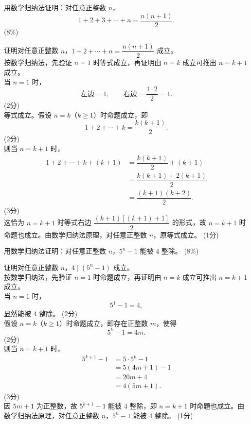 \documentclass[12pt,a4paper]{exam-zh}
\begin{document}
\begin{question}[points = 8]
    用数学归纳法证明：对任意正整数 $n$，
    \[
    1+2+3+\cdots+n=\dfrac{n(n+1)}{2}.
    \]
    \hfill (8\%)
\end{question}

\begin{solution}
    证明对任意正整数 $n$，$1+2+\cdots+n=\dfrac{n(n+1)}{2}$ 成立。\\
    按数学归纳法，先验证 $n=1$ 时等式成立，再证明由 $n=k$ 成立可推出 $n=k+1$ 成立。\\
    当 $n=1$ 时，
    \[
    \text{左边}=1,\qquad \text{右边}=\dfrac{1\cdot 2}{2}=1.
    \]
    \hfill (2分) \\
    等式成立。假设 $n=k$（$k\geqslant 1$）时命题成立，即
    \[
    1+2+\cdots+k=\dfrac{k(k+1)}{2}.
    \]
    \hfill (2分) \\
    则当 $n=k+1$ 时，
    \begin{align*}
        1+2+\cdots+k+(k+1) &= \dfrac{k(k+1)}{2}+(k+1) \\
        &= \dfrac{k(k+1)+2(k+1)}{2} \\
        &= \dfrac{(k+1)(k+2)}{2}.
    \end{align*}
    \hfill (3分) \\
    这恰为 $n=k+1$ 时等式右边 $\dfrac{(k+1)\left[(k+1)+1\right]}{2}$ 的形式，故 $n=k+1$ 时命题也成立。由数学归纳法原理，对任意正整数 $n$，原等式成立。
    \hfill (1分)
\end{solution}

\begin{question}[points = 8]
    用数学归纳法证明：对任意正整数 $n$，$5^n-1$ 能被 $4$ 整除。
    \hfill (8\%)
\end{question}

\begin{solution}
    证明对任意正整数 $n$，$4\mid(5^n-1)$ 成立。\\
    按数学归纳法，先验证 $n=1$ 时命题成立，再证明由 $n=k$ 成立可推出 $n=k+1$ 成立。\\
    当 $n=1$ 时，
    \[
    5^1-1=4,
    \]
    显然能被 $4$ 整除。
    \hfill (2分) \\
    假设 $n=k$（$k\geqslant 1$）时命题成立，即存在正整数 $m$，使得
    \[
    5^k-1=4m.
    \]
    \hfill (2分) \\
    则当 $n=k+1$ 时，
    \begin{align*}
        5^{k+1}-1 &= 5\cdot 5^k-1 \\
        &= 5(4m+1)-1 \\
        &= 20m+4 \\
        &= 4(5m+1).
    \end{align*}
    \hfill (3分) \\
    因 $5m+1$ 为正整数，故 $5^{k+1}-1$ 能被 $4$ 整除，即 $n=k+1$ 时命题也成立。由数学归纳法原理，对任意正整数 $n$，$5^n-1$ 能被 $4$ 整除。
    \hfill (1分)
\end{solution}
\end{document}
